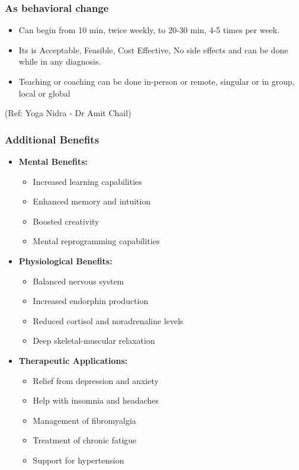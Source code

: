 \begin{frame}[fragile]\frametitle{As behavioral change}


    \begin{itemize}
        \item Can begin from 10 min, twice weekly, to 20-30 min, 4-5 times per week.
		\item Its is Acceptable, Feasible, Cost Effective, No side effects and can be done while in any diagnosis.
		\item Teaching or coaching can be done in-person or remote, singular or in group, local or global
    \end{itemize}
	
		{\tiny (Ref: Yoga Nidra - Dr Amit Chail)}		

\end{frame}

\begin{frame}[fragile]\frametitle{Additional Benefits}
    \begin{itemize}
        \item \textbf{Mental Benefits:}
        \begin{itemize}
            \item Increased learning capabilities
            \item Enhanced memory and intuition
            \item Boosted creativity
            \item Mental reprogramming capabilities
        \end{itemize}
        \item \textbf{Physiological Benefits:}
        \begin{itemize}
            \item Balanced nervous system
            \item Increased endorphin production
            \item Reduced cortisol and noradrenaline levels
            \item Deep skeletal-muscular relaxation
        \end{itemize}
        \item \textbf{Therapeutic Applications:}
        \begin{itemize}
            \item Relief from depression and anxiety
            \item Help with insomnia and headaches
            \item Management of fibromyalgia
            \item Treatment of chronic fatigue
            \item Support for hypertension
        \end{itemize}
    \end{itemize}
\end{frame}

